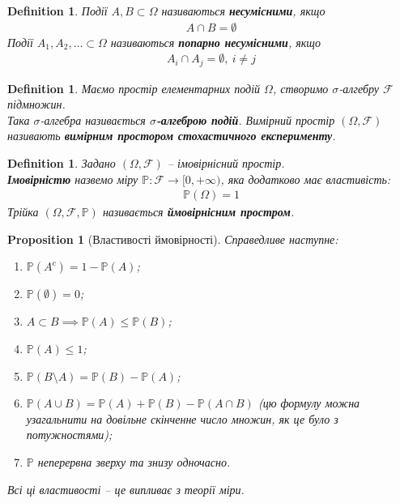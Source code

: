 \documentclass[a4paper, 10pt]{article}
\theoremstyle{theoremdd}
\newtheorem{definition}[theorem]{Definition}
\newtheorem{proposition}[theorem]{Proposition}
\begin{document}
\begin{definition}
Події $A,B \subset \Omega$ називаються \textbf{несумісними}, якщо
\begin{align*}
A \cap B = \emptyset
\end{align*}
Події $A_1,A_2,\dots \subset \Omega$ називаються \textbf{попарно несумісними}, якщо
\begin{align*}
A_i \cap A_j = \emptyset,\ i \neq j
\end{align*}
\end{definition}

\begin{definition}
Маємо простір елементарних подій $\Omega$, створимо $\sigma$-алгебру $\mathcal{F}$ підмножин.\\
Така $\sigma$-алгебра називається \textbf{$\sigma$-алгеброю подій}. Вимірний простір $(\Omega,\mathcal{F})$ називають \textbf{вимірним простором стохастичного експерименту}.
\end{definition}

\begin{definition}
Задано $(\Omega,\mathcal{F})$ -- імовірнісний простір.\\
\textbf{Імовірністю} назвемо міру $\mathbb{P} \colon \mathcal{F} \to [0,+\infty)$, яка додатково має властивість:
\begin{align*}
\mathbb{P}(\Omega) = 1
\end{align*}
Трійка $(\Omega,\mathcal{F},\mathbb{P})$ називається \textbf{ймовірнісним простром}.
\end{definition}

\begin{proposition}[Властивості ймовірності]
Справедливе наступне:
\begin{enumerate}[nosep,wide=0pt,label={\arabic*)}]
\item $\mathbb{P}(A^c) = 1 - \mathbb{P}(A)$;
\item $\mathbb{P}(\emptyset) = 0$;
\item $A \subset B \implies \mathbb{P}(A) \leq \mathbb{P}(B)$;
\item $\mathbb{P}(A) \leq 1$;
\item $\mathbb{P}(B \setminus A) = \mathbb{P}(B) - \mathbb{P}(A)$;
\item $\mathbb{P}(A \cup B) = \mathbb{P}(A) + \mathbb{P}(B) - \mathbb{P}(A \cap B)$ (цю формулу можна узагальнити на довільне скінченне число множин, як це було з потужностями);
\item $\mathbb{P}$ неперервна зверху та знизу одночасно.
\end{enumerate}
\textit{Всі ці властивості -- це випливає з теорії міри.}
\end{proposition}
\end{document}
